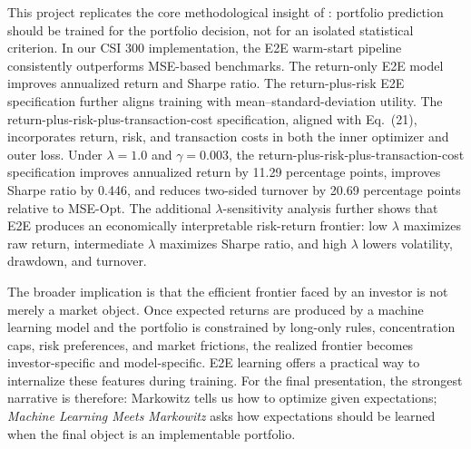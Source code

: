 \documentclass[11pt]{article}
\begin{document}
This project replicates the core methodological insight of \citet{wang2026mlmm}: portfolio prediction should be trained for the portfolio decision, not for an isolated statistical criterion. In our CSI 300 implementation, the E2E warm-start pipeline consistently outperforms MSE-based benchmarks. The return-only E2E model improves annualized return and Sharpe ratio. The return-plus-risk E2E specification further aligns training with mean--standard-deviation utility. The return-plus-risk-plus-transaction-cost specification, aligned with Eq.~(21), incorporates return, risk, and transaction costs in both the inner optimizer and outer loss. Under $\lambda=1.0$ and $\gamma=0.003$, the return-plus-risk-plus-transaction-cost specification improves annualized return by 11.29 percentage points, improves Sharpe ratio by 0.446, and reduces two-sided turnover by 20.69 percentage points relative to MSE-Opt. The additional $\lambda$-sensitivity analysis further shows that E2E produces an economically interpretable risk-return frontier: low $\lambda$ maximizes raw return, intermediate $\lambda$ maximizes Sharpe ratio, and high $\lambda$ lowers volatility, drawdown, and turnover.

The broader implication is that the efficient frontier faced by an investor is not merely a market object. Once expected returns are produced by a machine learning model and the portfolio is constrained by long-only rules, concentration caps, risk preferences, and market frictions, the realized frontier becomes investor-specific and model-specific. E2E learning offers a practical way to internalize these features during training. For the final presentation, the strongest narrative is therefore: Markowitz tells us how to optimize given expectations; \emph{Machine Learning Meets Markowitz} asks how expectations should be learned when the final object is an implementable portfolio.
\end{document}

